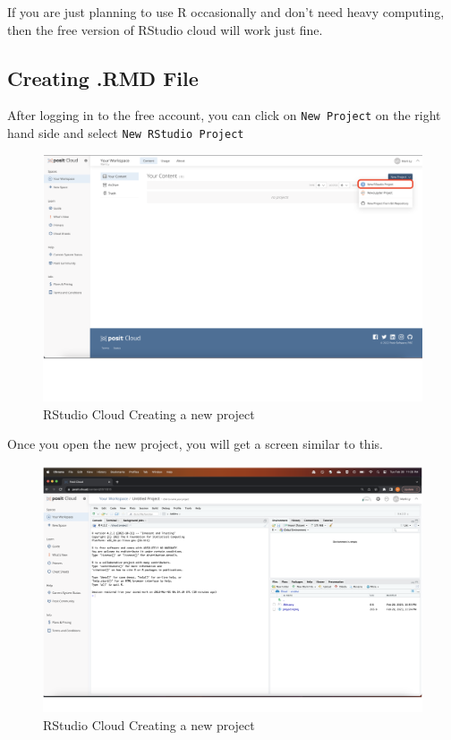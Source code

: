 \documentclass[
]{book}
\begin{document}
If you are just planning to use R occasionally and don't need heavy computing, then the free version of RStudio cloud will work just fine.

\hypertarget{creating-.rmd-file-1}{%
\subsection{Creating .RMD File}\label{creating-.rmd-file-1}}

After logging in to the free account, you can click on \texttt{New\ Project} on the right hand side and select \texttt{New\ RStudio\ Project}

\begin{figure}
\includegraphics[width=50in]{images/2.6rmarkdowncloud} \caption{RStudio Cloud Creating a new project}\label{fig:unnamed-chunk-9}
\end{figure}

Once you open the new project, you will get a screen similar to this.

\begin{figure}
\includegraphics[width=50in]{images/2.7rstudiocloud} \caption{RStudio Cloud Creating a new project}\label{fig:unnamed-chunk-10}
\end{figure}
\end{document}
